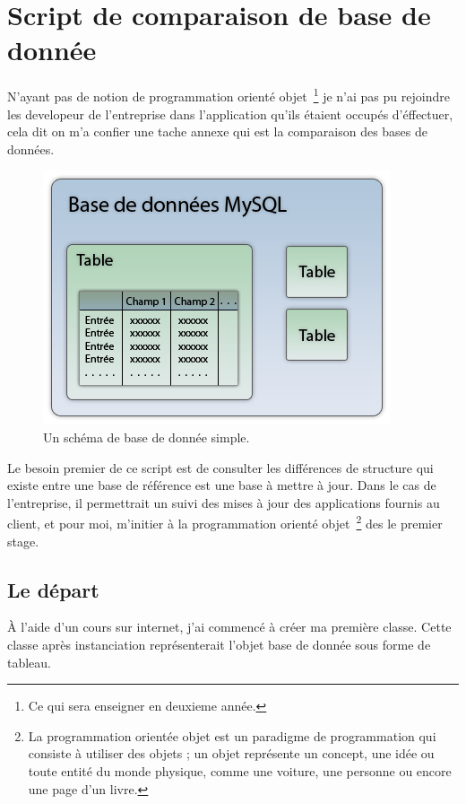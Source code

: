 \chapter{Script de comparaison de base de donnée}

N'ayant pas de notion de programmation orienté objet\, \footnote{Ce qui sera
enseigner en deuxieme année.} je n'ai pas pu rejoindre les developeur de
l'entreprise dans l'application qu'ils étaient occupés d'éffectuer, cela dit on
m'a confier une tache annexe qui est la comparaison des bases de données.

\begin{figure}
\begin{center}
\includegraphics[scale=0.5]{images/bdd.png}
\end{center}
\caption{Un schéma de base de donnée simple.}
\end{figure}

Le besoin premier de ce script est de consulter les différences de structure qui
existe entre une base de référence est une base à mettre à jour. Dans le cas de
l'entreprise, il permettrait un suivi des mises à jour des applications fournis
au client, et pour moi, m'initier à la programmation orienté objet\,
\footnote{La programmation orientée objet est un paradigme de programmation qui
consiste à utiliser des objets ; un objet représente un concept, une idée ou
toute entité du monde physique, comme une voiture, une personne ou encore une
page d'un livre.} des le premier stage.

\section{Le départ}

À l'aide d'un cours sur internet, j'ai commencé à créer ma première classe.
Cette classe après instanciation représenterait l'objet \og{} base de donnée
\fg{} sous forme de tableau.

